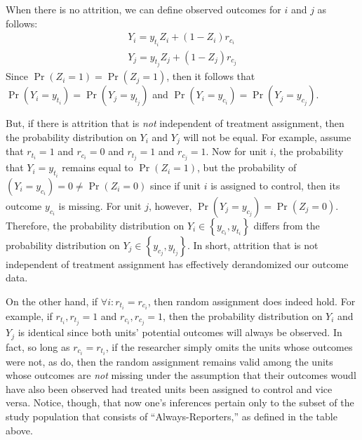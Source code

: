 \documentclass[11pt]{article}\usepackage[]{graphicx}\usepackage[]{color}
\theoremstyle{newstyle}
\begin{document}
When there is no attrition, we can define observed outcomes for $i$ and $j$ as follows:
\begin{align*}
Y_i = y_{t_i}Z_i + \left(1 - Z_i\right)r_{c_i} \\ 
Y_j = y_{t_j}Z_j + \left(1 - Z_j\right)r_{c_j}
\end{align*}
Since $\Pr\left(Z_i = 1\right) = \Pr\left(Z_j = 1\right)$, then it follows that $\Pr\left(Y_i = y_{t_i}\right) = \Pr\left(Y_j = y_{t_j}\right)$ and $\Pr\left(Y_i = y_{c_i}\right) = \Pr\left(Y_j = y_{c_j}\right)$.

But, if there is attrition that is \textit{not} independent of treatment assignment, then the probability distribution on $Y_i$ and $Y_j$ will not be equal. For example, assume that $r_{t_i} = 1$ and $r_{c_i} = 0$ and $r_{t_j} = 1$ and $r_{c_j} = 1$. Now for unit $i$, the probability that $Y_i = y_{t_i}$ remains equal to $\Pr\left(Z_i = 1\right)$, but the probability of $\left(Y_i = y_{c_i}\right) = 0 \neq \Pr\left(Z_i = 0\right)$ since if unit $i$ is assigned to control, then its outcome $y_{c_i}$ is missing. For unit $j$, however, $\Pr\left(Y_j = y_{c_j}\right) = \Pr\left(Z_j = 0\right)$. Therefore, the probability distribution on $Y_i \in \left\{y_{c_i}, y_{t_i}\right\}$ differs from the probability distribution on $Y_j \in \left\{y_{c_j}, y_{t_j}\right\}$. In short, attrition that is not independent of treatment assignment has effectively derandomized our outcome data.

On the other hand, if $\forall i: r_{t_i} = r_{c_i}$, then random assignment does indeed hold. For example, if $r_{t_i}, r_{t_j} = 1$ and $r_{c_i}, r_{c_j} = 1$, then the probability distribution on $Y_i$ and $Y_j$ is identical since both units' potential outcomes will always be observed. In fact, so long as $r_{c_i} = r_{t_i}$, if the researcher simply omits the units whose outcomes were not, as \citet{albertsonlawrence2009} do, then the random assignment remains valid among the units whose outcomes are \textit{not} missing under the assumption that their outcomes woudl have also been observed had treated units been assigned to control and vice versa. Notice, though, that now one's inferences pertain only to the subset of the study population that consists of ``Always-Reporters,'' as defined in the table above.



\newpage

\begin{singlespace}

\end{singlespace}
\end{document}
